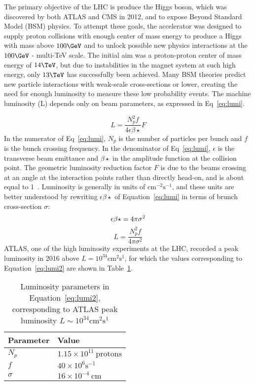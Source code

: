 The primary objective of the LHC is produce the Higgs boson, which was discovered by both ATLAS and CMS in 2012, and to expose Beyond Standard Model (BSM) physics.  To attempt these goals, the accelerator was designed to supply proton collisions with enough center of mass energy to produce a Higgs with mass above $100\GeV$ and to unlock possible new physics interactions at the $100\GeV$ - multi-TeV scale.  The initial aim was a proton-proton center of mass energy of $14 \TeV$, but due to instabilities in the magnet system at such high energy, only $13\TeV$ has successfully been achieved.  Many BSM theories predict new particle interactions with weak-scale cross-sections or lower, creating the need for enough luminosity to measure these low probability events.  The machine luminosity (L) depends only on beam parameters, as expressed in Eq~\ref{eq:lumi}.

\begin{equation}
L=\frac{N_p^2f}{4\epsilon\beta\star}F
\label{eq:lumi}
\end{equation}
In the numerator of Eq~\ref{eq:lumi}, $N_p$ is the number of particles per bunch and $f$ is the bunch crossing frequency.  In the denominator of Eq~\ref{eq:lumi}, $\epsilon$ is the transverse beam emittance and $\beta\star$ in the amplitude function at the collision point.  The geometric luminosity reduction factor $F$ is due to the beams crossing at an angle at the interaction points rather than directly head-on, and is about equal to 1~\cite{cid}.  Luminosity is generally in units of $\mathrm{cm}^{-2}\mathrm{s}^{-1}$, and these units are better understood by rewriting $\epsilon\beta\star$ of Equation~\ref{eq:lumi} in terms of brunch cross-section $\sigma$:
\begin{equation}
\epsilon\beta\star=4\pi\sigma^2\\
\label{eq:eb}
\end{equation} 
\begin{equation}
L=\frac{N_p^2f}{4\pi\sigma^2}
\label{eq:lumi2}
\end{equation} 
 ATLAS, one of the high luminosity experiments at the LHC, recorded a peak luminosity in 2016 above $L=10^{34}\mathrm{cm}^2\mathrm{s}^1$, for which the values corresponding to Equation~\ref{eq:lumi2} are shown in Table~\ref{tab:lumi}.
\begin{table}[!htp]
\centering
\small
\begin{tabular}{ll}
Parameter  & Value  \\
\hline \hline
$N_p$ & $1.15\times 10^{11}~\mathrm{protons}$ \\ 
$f$ & $40\times10^{6}\mathrm{s}^{-1}$ \\  
$\sigma$& $16\times10^{-4}~\mathrm{cm}$   \\
\hline 
\end{tabular}
\caption{Luminosity parameters in Equation~\ref{eq:lumi2}, corresponding to ATLAS peak luminosity $L\sim10^{34}\mathrm{cm}^2\mathrm{s}^1$}
\label{tab:lumi}
\end{table} 

